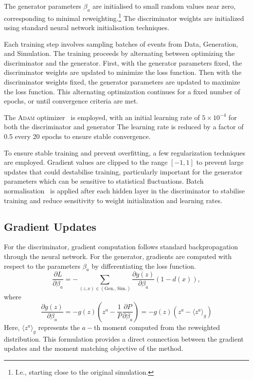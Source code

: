         The generator parameters $\beta_a$ are initialised to small random values near zero, corresponding to minimal reweighting.\footnote{I.e., starting close to the original simulation.}
        The discriminator weights are initialized using standard neural network initialisation techniques\cite{7410480}.
        
        Each training step involves sampling batches of events from Data, Generation, and Simulation.
        The training proceeds by alternating between optimizing the discriminator and the generator.
        First, with the generator parameters fixed, the discriminator weights are updated to minimize the loss function.
        Then with the discriminator weights fixed, the generator parameters are updated to maximize the loss function.
        This alternating optimization continues for a fixed number of epochs, or until convergence criteria are met.

        The \textsc{Adam} optimizer~\cite{kingma_adam_2017} is employed, with an initial learning rate of $5 \times 10^{-4}$ for both the discriminator and generator
        The learning rate is reduced by a factor of 0.5 every 20 epochs to ensure stable convergence.

        To ensure stable training and prevent overfitting, a few regularization techniques are employed.
        Gradient values are clipped to the range $[-1, 1]$ to prevent large updates that could destabilise training, particularly important for the generator parameters which can be sensitive to statistical fluctuations.
        Batch normalisation~\cite{Ioffe2015BatchShift} is applied after each hidden layer in the discriminator to stabilise training and reduce sensitivity to weight initialization and learning rates.
    \subsection{Gradient Updates}
        For the discriminator, gradient computation follows standard backpropagation through the neural network.
        For the generator, gradients are computed with respect to the parameters $\beta_a$ by differentiating the loss function.
        \[ 
            \frac{\partial L}{\partial \beta_a} = -\sum_{(z,x) \in (\text{Gen., Sim.})} \frac{\partial g(z)}{\partial \beta_a}(1-d(x)),
        \]
        where
        \[
            \frac{\partial g(z)}{\partial \beta_a} = -g(z)\left(z^a - \frac{1}{P}\frac{\partial P}{\partial \beta_a}\right) = -g(z)(z^a - \langle z^a \rangle_{g})
        \]
        Here, $\langle z^a \rangle_{g}$ represents the $a-$th moment computed from the reweighted distribution.
        This formulation provides a direct connection between the gradient updates and the moment matching objective of the method.
        
